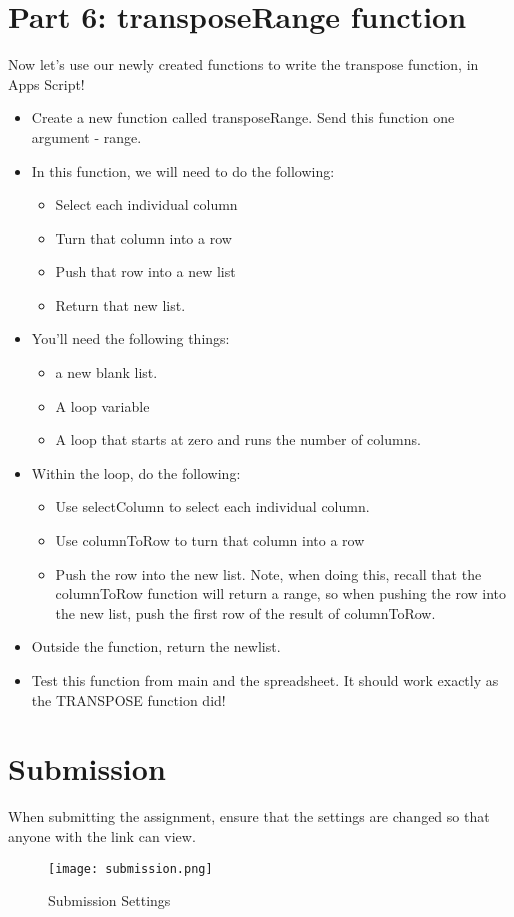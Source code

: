 \documentclass{article}
\begin{document}
\section*{Part 6: transposeRange function}
Now let's use our newly created functions to write the transpose function, in Apps Script!
\begin{itemize}
    \item Create a new function called transposeRange.  Send this function one argument - range.
    \item In this function, we will need to do the following:
    \begin{itemize}
    		\item Select each individual column
    		\item Turn that column into a row
    		\item Push that row into a new list
    		\item Return that new list.
    	\end{itemize}
    	\item You'll need the following things:
    	\begin{itemize}
    		\item a new blank list.
    		\item A loop variable
    		\item A loop that starts at zero and runs the number of columns.
    	\end{itemize}
    	\item Within the loop, do the following:
    	\begin{itemize}
    		\item Use selectColumn to select each individual column.
    		\item Use columnToRow to turn that column into a row
    		\item Push the row into the new list.  Note, when doing this, recall that the columnToRow function will return a range, so when pushing the row into the new list, push the first row of the result of columnToRow. 
    	\end{itemize}
    	\item Outside the function, return the newlist.
    	\item Test this function from main and the spreadsheet.  It should work exactly as the TRANSPOSE function did!
\end{itemize}

\section*{Submission}
When submitting the assignment, ensure that the settings are changed so that anyone with the link can view.
\begin{figure}[H]
  \centering
  \texttt{[image: submission.png]}
  \caption{Submission Settings}
\end{figure}
\end{document}
